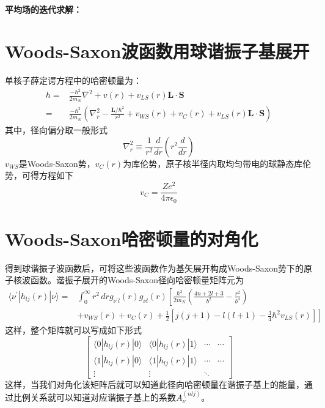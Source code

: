 \paragraph*{平均场的迭代求解：}



\section{Woods-Saxon波函数用球谐振子基展开}
单核子薛定谔方程中的哈密顿量为：
\begin{equation}
	\begin{aligned}
		h =& \frac{-\hbar^2}{2 m_{N}} \nabla^2 + v(r) + v_{LS}(r) \boldsymbol{L\cdot S}	\\
		=& \frac{-\hbar^2}{2 m_{N}}\left(\nabla^2_{r} - \frac{\boldsymbol{L}/\hbar^2}{r^2} + v_{WS}(r) + v_{C}(r) + v_{LS}(r)\boldsymbol{L\cdot S}\right)
	\end{aligned}
\end{equation} 
其中，径向偏分取一般形式
\begin{equation}
	\nabla^2_{r} \equiv \frac{1}{r^2} \frac{d}{dr} \left(r^2 \frac{d}{dr}\right)
\end{equation}
$v_{WS}$是Woods-Saxon势，$v_{C}(r)$为库伦势，原子核半径内取均匀带电的球静态库伦势，可得方程如下
\begin{equation}
	v_{C} = \frac{Ze^2}{4\pi\epsilon_0}
\end{equation} 

\section{Woods-Saxon哈密顿量的对角化}
得到球谐振子波函数后，可将这些波函数作为基矢展开构成Woods-Saxon势下的原子核波函数。谐振子展开的Woods-Saxon径向哈密顿量矩阵元为
\begin{equation}
    \begin{aligned}
		\langle \nu^{\prime} | h_{lj}(r) | \nu\rangle =&\int_{0}^{\infty} r^2 \,dr g_{\nu^{\prime} l}(r) g_{\nu l}(r) \left[ \frac{\hbar^2}{2m_N} \left(\frac{4n + 2l + 3}{b^2} - \frac{r^2}{b^4}\right) \right. \\
		&+ \left. v_{WS}(r) + v_{C}(r) + \frac{1}{2}\left[j(j+1) - l(l+1) - \frac{3}{4}\hbar^2 v_{LS}(r)\right] \right]
    \end{aligned}
\end{equation}
这样，整个矩阵就可以写成如下形式
\begin{equation}
	\begin{bmatrix}
		\langle 0 | h_{lj}(r) | 0 \rangle & \langle 0 | h_{lj}(r) | 1 \rangle & \cdots	& \cdots	\\
		\langle 1 | h_{lj}(r) | 0 \rangle & \langle 1 | h_{lj}(r) | 1 \rangle & \cdots	& \cdots	\\
		\vdots	&	\vdots	& \ddots
	\end{bmatrix}
\end{equation}
这样，当我们对角化该矩阵后就可以知道此径向哈密顿量在谐振子基上的能量，通过比例关系就可以知道对应谐振子基上的系数$A_{\nu}^{(nlj)}$。


